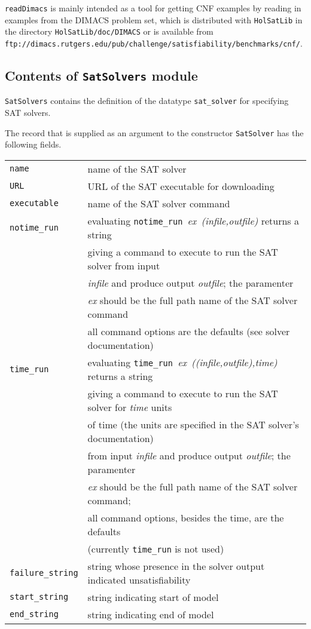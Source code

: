 \documentclass[12pt]{article}
\renewcommand{\t}[1]{\mbox{\small\tt #1}}
\begin{document}
{\small{\tt readDimacs}} is mainly intended as a tool for getting
CNF examples by reading in examples from the DIMACS problem set,
which is distributed with {\tt HolSatLib} in the directory
{\tt HolSatLib/doc/DIMACS} or is available from\\
{\tt ftp://dimacs.rutgers.edu/pub/challenge/satisfiability/benchmarks/cnf/}.

\subsection{Contents of {\tt SatSolvers} module}

{\tt SatSolvers} contains the definition of the datatype
\t{sat\_solver} for specifying SAT solvers.


The record that is supplied as an argument to the constructor \t{SatSolver}
has the following fields.

\medskip

\begin{tabular}{ll}
\t{name} &
name of the SAT solver \\

\t{URL} &
URL of the SAT executable for downloading\\

\t{executable} &
name of the SAT solver command\\

\t{notime\_run} &
evaluating \t{notime\_run}{\it~ex~(infile,outfile)} returns a string\\
 & giving a command to execute to run the SAT solver from input\\
 & {\it infile} and produce output {\it outfile}; the paramenter\\
 & {\it ex} should be the full path name of the  SAT solver command\\
 & all command options are the defaults (see solver documentation)\\

\t{time\_run} &
evaluating \t{time\_run}{\it~ex~((infile,outfile),time)} returns a string\\
 & giving a command to execute to run the SAT solver for {\it time} units\\
 & of time (the units are specified in the SAT solver's documentation)\\
 & from input {\it infile} and produce output {\it outfile}; the paramenter\\
 & {\it ex} should be the full path name of the  SAT solver command;\\
 & all command options, besides the time, are the defaults\\
 & (currently \t{time\_run} is not used)\\

\t{failure\_string} &
string whose presence in the solver output indicated unsatisfiability\\


\t{start\_string} &
string indicating start of model \\


\t{end\_string} &
string indicating end of model \\

\end{tabular}
\end{document}
